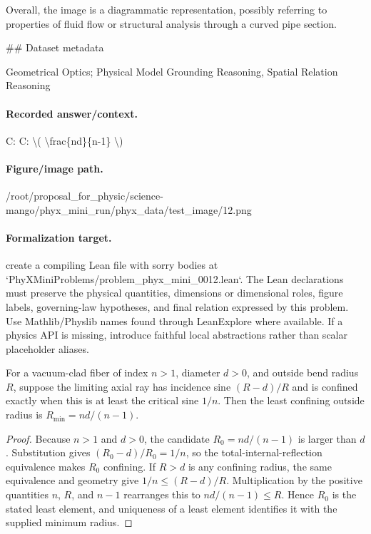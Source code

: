 Overall, the image is a diagrammatic representation, possibly referring to properties of fluid flow or structural analysis through a curved pipe section.

\#\# Dataset metadata

Geometrical Optics; Physical Model Grounding Reasoning, Spatial Relation Reasoning

\paragraph{Recorded answer/context.}
C: C: \textbackslash{}( \textbackslash{}frac\{nd\}\{n-1\} \textbackslash{})

\paragraph{Figure/image path.}
/root/proposal\_for\_physic/science-mango/phyx\_mini\_run/phyx\_data/test\_image/12.png

\paragraph{Formalization target.}
create a compiling Lean file with sorry bodies at `PhyXMiniProblems/problem\_phyx\_mini\_0012.lean`. The Lean declarations must preserve the physical quantities, dimensions or dimensional roles, figure labels, governing-law hypotheses, and final relation expressed by this problem.
Use Mathlib/Physlib names found through LeanExplore where available. If a physics API is missing, introduce faithful local abstractions rather than scalar placeholder aliases.

\begin{theorem}
\label{thm:physics:phyx_mini_0012:target}
For a vacuum-clad fiber of index \(n>1\), diameter \(d>0\), and outside
bend radius \(R\), suppose the limiting axial ray has incidence sine
\((R-d)/R\) and is confined exactly when this is at least the critical sine
\(1/n\).  Then the least confining outside radius is
\(R_{\min}=nd/(n-1)\).
\end{theorem}
\begin{proof}
Because \(n>1\) and \(d>0\), the candidate \(R_0=nd/(n-1)\) is larger than
\(d\).  Substitution gives
\((R_0-d)/R_0=1/n\), so the total-internal-reflection equivalence makes
\(R_0\) confining.  If \(R>d\) is any confining radius, the same equivalence
and geometry give \(1/n\leq(R-d)/R\).  Multiplication by the positive
quantities \(n\), \(R\), and \(n-1\) rearranges this to
\(nd/(n-1)\leq R\).  Hence \(R_0\) is the stated least element, and uniqueness
of a least element identifies it with the supplied minimum radius.
\end{proof}

